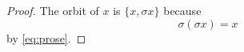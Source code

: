 \begin{proof}
The orbit of $x$ is $\{x, \sigma x\}$ because
\begin{equation}\label{eq:step}
\sigma(\sigma x) = x
\end{equation}
by \eqref{eq:prose}.
\end{proof}